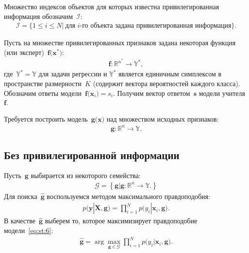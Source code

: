 \documentclass[12pt, twoside]{article}
\numberwithin{equation}{section}
\begin{document}
Множество индексов объектов для которых известна привилегированная информация обозначим~$\mathcal{I}$:
\[
\label{eq:st:3}
\begin{aligned}
\mathcal{I} = \{1 \leq i \leq N |~\text{для $i$-го объекта задана привилегированная информация}\}.
\end{aligned}
\]

Пусть на множестве привилегированных признаков задана некоторая функция (или эксперт)~$\textbf{f}\bigr(\textbf{x}^*\bigr)$:
\[
\label{eq:st:4}
\begin{aligned}
\textbf{f}:\mathbb{R}^{n^*} \to \mathbb{Y}^*,
\end{aligned}
\]
где~$\mathbb{Y}^*=\mathbb{Y}$ для задачи регрессии и $\mathbb{Y}^*$ является единичным симплексом в пространстве размерности~$K$ (содержит вектора вероятностей каждого класса). Обозначим ответы модели~$\textbf{f}\bigr(\textbf{x}_i\bigr)=s_i$.  Получим вектор ответом~$\textbf{s}$ модели учителя~$\textbf{f}$.

Требуется построить модель~$\textbf{g}\bigr(\textbf{x}\bigr)$ над множеством исходных признаков:
\[
\label{eq:st:5}
\begin{aligned}
\textbf{g}:\mathbb{R}^{n} \to \mathbb{Y}.
\end{aligned}
\]
\subsection{Без привилегированной информации}
Пусть~$\textbf{g}$ выбирается из некоторого семейства:
\[
\label{eq:st:G}
\begin{aligned}
\mathcal{G} = \left\{\textbf{g}| \textbf{g}:\mathbb{R}^{n} \to \mathbb{Y}.\right\}
\end{aligned}
\]
Для поиска~$\hat{\textbf{g}}$ воспользуемся методом максимального правдоподобия:
\[
\label{eq:st:6}
\begin{aligned}
p\bigr(\textbf{y}|\textbf{X}, \textbf{g}\bigr) = \prod_{i=1}^{N}p\bigr(y_{i}|\textbf{x}_i, \textbf{g}\bigr).
\end{aligned}
\]
В качестве~$\hat{\textbf{g}}$ выберем то, которое максимизирует правдоподобие модели~\eqref{eq:st:6}:
\[
\label{eq:st:7}
\begin{aligned}
\hat{\textbf{g}} = \arg\max_{\textbf{g}\in \mathcal{G}} \prod_{i=1}^{N}p\bigr(y_{i}|\textbf{x}_i, \textbf{g}\bigr).
\end{aligned}
\]
\end{document}
